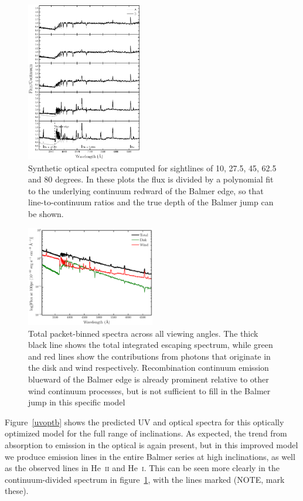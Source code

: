 \documentclass[preprint, a4paper, 11pt]{aastex}
\begin{document}
\begin{figure} 
\includegraphics[width=0.45\textwidth]{figures/modelb_opt_cont.eps}
\caption{
Synthetic optical spectra computed for 
sightlines of 10, 27.5, 45, 62.5 and 80 degrees. In these plots
the flux is divided by a polynomial fit to the 
underlying continuum redward of the Balmer edge, so that 
line-to-continuum ratios and the true depth of the
Balmer jump can be shown.
}
\label{continuumb}
\end{figure} 

\begin{figure} 
\includegraphics[width=0.5\textwidth]{figures/modelb_escaping.eps}
\caption{Total packet-binned spectra across all viewing angles. 
The thick black line shows the total 
integrated escaping spectrum, while green and red lines show the contributions from photons that originate in the disk and wind respectively. 
Recombination continuum emission blueward of the Balmer 
edge is already prominent relative to other wind continuum processes, but is not sufficient
to fill in the Balmer jump in this specific model}
\label{modelb_escape}
\end{figure} 

Figure~\ref{uvoptb} shows the predicted UV and optical spectra for this
optically optimized model for the full range of inclinations. 
As expected, the trend from absorption to emission 
in the optical is again present, but in this improved model we produce emission
lines in the entire Balmer series at high inclinations, as well as the observed lines 
in He~\textsc{ii} and He~\textsc{i}. This can be seen more clearly in the 
continuum-divided spectrum in figure~\ref{continuumb}, with the lines marked
(NOTE, mark these). 
\end{document}
